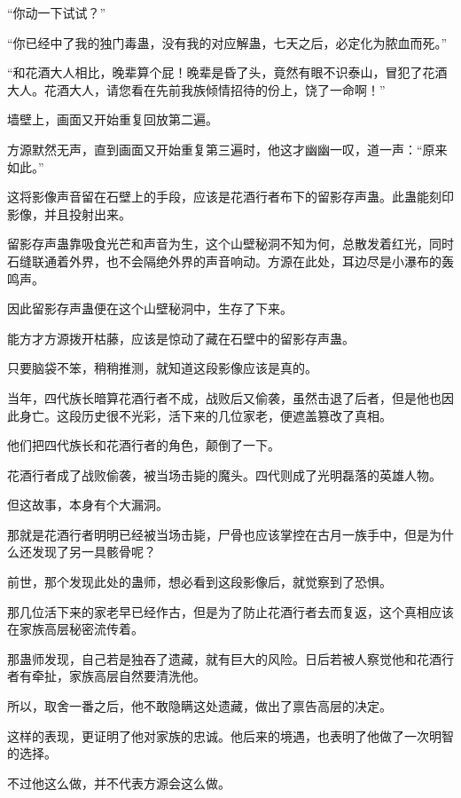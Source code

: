 
\begin{this_body}

“你动一下试试？”

“你已经中了我的独门毒蛊，没有我的对应解蛊，七天之后，必定化为脓血而死。”

“和花酒大人相比，晚辈算个屁！晚辈是昏了头，竟然有眼不识泰山，冒犯了花酒大人。花酒大人，请您看在先前我族倾情招待的份上，饶了一命啊！”

墙壁上，画面又开始重复回放第二遍。

方源默然无声，直到画面又开始重复第三遍时，他这才幽幽一叹，道一声：“原来如此。”

这将影像声音留在石壁上的手段，应该是花酒行者布下的留影存声蛊。此蛊能刻印影像，并且投射出来。

留影存声蛊靠吸食光芒和声音为生，这个山壁秘洞不知为何，总散发着红光，同时石缝联通着外界，也不会隔绝外界的声音响动。方源在此处，耳边尽是小瀑布的轰鸣声。

因此留影存声蛊便在这个山壁秘洞中，生存了下来。

能方才方源拨开枯藤，应该是惊动了藏在石壁中的留影存声蛊。

只要脑袋不笨，稍稍推测，就知道这段影像应该是真的。

当年，四代族长暗算花酒行者不成，战败后又偷袭，虽然击退了后者，但是他也因此身亡。这段历史很不光彩，活下来的几位家老，便遮盖篡改了真相。

他们把四代族长和花酒行者的角色，颠倒了一下。

花酒行者成了战败偷袭，被当场击毙的魔头。四代则成了光明磊落的英雄人物。

但这故事，本身有个大漏洞。

那就是花酒行者明明已经被当场击毙，尸骨也应该掌控在古月一族手中，但是为什么还发现了另一具骸骨呢？

前世，那个发现此处的蛊师，想必看到这段影像后，就觉察到了恐惧。

那几位活下来的家老早已经作古，但是为了防止花酒行者去而复返，这个真相应该在家族高层秘密流传着。

那蛊师发现，自己若是独吞了遗藏，就有巨大的风险。日后若被人察觉他和花酒行者有牵扯，家族高层自然要清洗他。

所以，取舍一番之后，他不敢隐瞒这处遗藏，做出了禀告高层的决定。

这样的表现，更证明了他对家族的忠诚。他后来的境遇，也表明了他做了一次明智的选择。

不过他这么做，并不代表方源会这么做。


\end{this_body}
